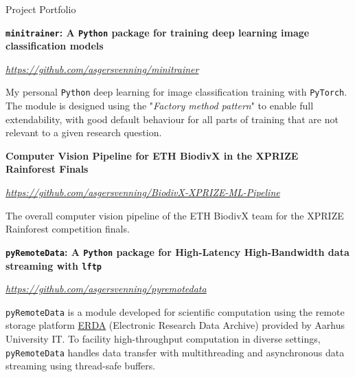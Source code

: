 
\begin{rubric}{Project Portfolio}

%
    \textbf{\texttt{mini\textunderscore trainer}: A \texttt{Python} package for training deep learning image classification models}\par
    \href{https://github.com/asgersvenning/mini_trainer}{\color{blue}\textit{https://github.com/asgersvenning/mini\textunderscore trainer}}\par
    \pind My personal \texttt{Python} deep learning for image classification training with \texttt{PyTorch}. The module is designed using the "\textit{Factory method pattern}" to enable full extendability, with good default behaviour for all parts of training that are not relevant to a given research question.

%
    \textbf{Computer Vision Pipeline for ETH BiodivX in the XPRIZE Rainforest Finals}\par
    \href{https://github.com/asgersvenning/BiodivX-XPRIZE-ML-Pipeline}{\color{blue}\textit{https://github.com/asgersvenning/BiodivX-XPRIZE-ML-Pipeline}}\par
    \pind The overall computer vision pipeline of the ETH BiodivX team for the XPRIZE Rainforest competition finals.

%
    \textbf{\texttt{pyRemoteData}: A \texttt{Python} package for High-Latency High-Bandwidth data streaming with \texttt{lftp}}\par
    \href{https://github.com/asgersvenning/pyremotedata}{\color{blue}\textit{https://github.com/asgersvenning/pyremotedata}}\par
    \pind \texttt{pyRemoteData} is a module developed for scientific computation using the remote storage platform \href{https://erda.au.dk/}{ERDA} (Electronic Research Data Archive) provided by Aarhus University IT. To facility high-throughput computation in diverse settings, \mbox{\texttt{pyRemoteData}} handles data transfer with multithreading and asynchronous data streaming using thread-safe buffers.


\end{rubric}
